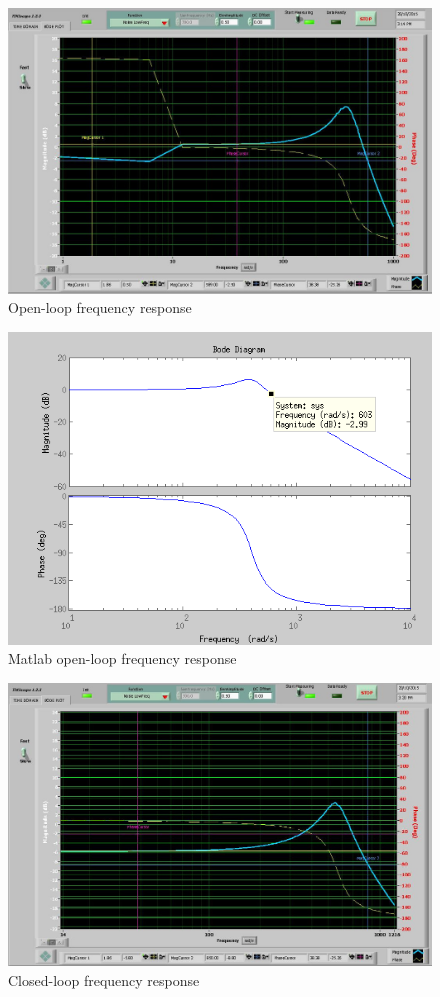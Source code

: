 \documentclass{article}
\begin{document}
\begin{figure}[!htbp]
\centering
\includegraphics[width=7in]{4_2c(open).jpg}
\caption{Open-loop frequency response}
\end{figure}

\begin{figure}[!htbp]
\centering
\includegraphics[width=7in]{4_2c(open)_matlab.png}
\caption{Matlab open-loop frequency response}
\end{figure}

\begin{figure}[!htbp]
\centering
\includegraphics[width=7in]{4_2c(closed).jpg}
\caption{Closed-loop frequency response}
\end{figure}
\end{document}

